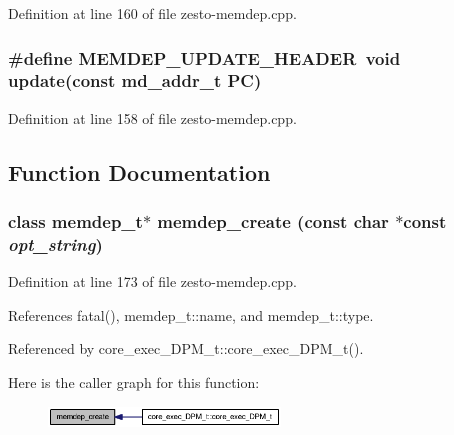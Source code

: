 Definition at line 160 of file zesto-memdep.cpp.
\subsubsection[{MEMDEP\_\-UPDATE\_\-HEADER}]{\setlength{\rightskip}{0pt plus 5cm}\#define MEMDEP\_\-UPDATE\_\-HEADER~void update(const {\bf md\_\-addr\_\-t} PC)}\label{zesto-memdep_8cpp_f6dfebb592973da9d6dd0c284dd00b83}




Definition at line 158 of file zesto-memdep.cpp.

\subsection{Function Documentation}
\subsubsection[{memdep\_\-create}]{\setlength{\rightskip}{0pt plus 5cm}class {\bf memdep\_\-t}$\ast$ memdep\_\-create (const char $\ast$const  {\em opt\_\-string})\hspace{0.3cm}{\tt  [read]}}\label{zesto-memdep_8cpp_0dd797035955474899f1ead13d08ddc0}




Definition at line 173 of file zesto-memdep.cpp.

References fatal(), memdep\_\-t::name, and memdep\_\-t::type.

Referenced by core\_\-exec\_\-DPM\_\-t::core\_\-exec\_\-DPM\_\-t().

Here is the caller graph for this function:\nopagebreak
\begin{figure}[H]
\begin{center}
\leavevmode
\includegraphics[width=175pt]{zesto-memdep_8cpp_0dd797035955474899f1ead13d08ddc0_icgraph}
\end{center}
\end{figure}
